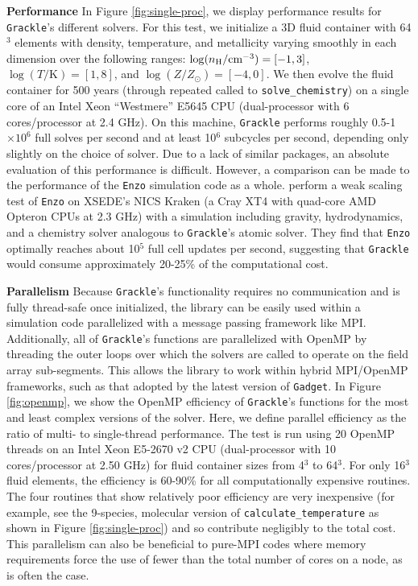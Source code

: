 \documentclass[11pt]{article}
\newcommand{\grackle}{\texttt{Grackle}}
\begin{document}
\begin{flushleft}
\noindent
{\bf Performance}
In Figure \ref{fig:single-proc}, we
display performance results for \grackle{}'s different solvers.  For
this test, we initialize a 3D fluid container with 64$^{3}$ elements
with density, temperature, and metallicity varying smoothly in each
dimension over the following ranges: $\log (n_{\rm H} /
\textrm{cm}^{-3}) = [-1, 3]$, $\log (T/\textrm{K}) = [1, 8]$, and
$\log (Z/Z_\odot) = [-4, 0]$.  We then evolve the fluid container for
500 years (through repeated called to \texttt{solve\_chemistry}) on a
single core of an Intel Xeon ``Westmere'' E5645 CPU (dual-processor with
6 cores/processor at 2.4 GHz).  On this machine, \grackle{} performs
roughly 0.5-1$\times10^{6}$ full solves per second and at least
10$^{6}$ subcycles per second, depending only slightly on the choice
of solver.  Due to a lack of similar packages, an absolute evaluation
of this performance is difficult.  However, a comparison can be made
to the performance of the \texttt{Enzo} simulation code as a whole.
\citet{2014ApJS..211...19B} perform a weak scaling test of
\texttt{Enzo} on XSEDE's NICS Kraken (a Cray XT4 with quad-core AMD
Opteron CPUs at 2.3 GHz) with a simulation including gravity,
hydrodynamics, and a chemistry solver analogous to \grackle{}'s atomic
solver.  They find that \texttt{Enzo} optimally reaches about 10$^{5}$
full cell updates per second, suggesting that \grackle{} would consume
approximately 20-25\% of the computational cost.

\noindent
{\bf Parallelism}
Because \grackle{}'s functionality requires no communication and is
fully thread-safe once initialized, the library can be easily used
within a simulation code parallelized with a message passing framework
like MPI.  Additionally, all of \grackle{}'s functions are
parallelized with OpenMP by threading the outer loops over which the
solvers are called to operate on the field array sub-segments.  This
allows the library to work within hybrid MPI/OpenMP frameworks, such
as that adopted by the latest version of \texttt{Gadget}.
In Figure \ref{fig:openmp}, we show the OpenMP efficiency of
\grackle{}'s functions for the most and least complex versions
of the solver.  Here, we define parallel efficiency as the ratio of
multi- to single-thread performance.  The test is run using 20 OpenMP
threads on an Intel Xeon E5-2670 v2 CPU (dual-processor with 10
cores/processor at 2.50 GHz) for fluid container sizes from 4$^{3}$ to
64$^{3}$.  For only 16$^{3}$ fluid elements, the efficiency is 60-90\%
for all computationally expensive routines.  The four routines that
show relatively poor efficiency are very inexpensive (for example, see
the 9-species, molecular version of \texttt{calculate\_temperature} as
shown in Figure \ref{fig:single-proc}) and so contribute negligibly to
the total cost.  This parallelism can also be beneficial to pure-MPI codes
where memory requirements force the use of fewer than the total number
of cores on a node, as is often the case.


\end{flushleft}
\end{document}
